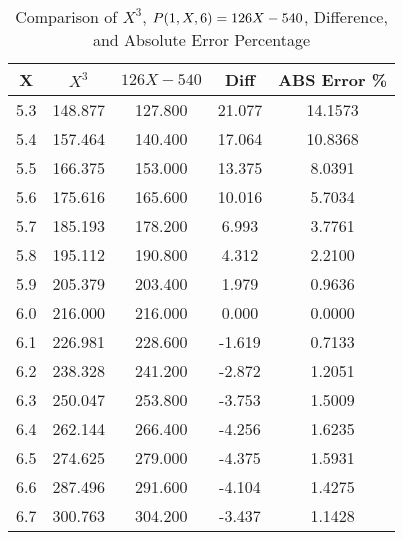 ﻿%
\begin{table}[h!]
    \centering
    \caption{Comparison of $X^3$, ${P}(1,X,6) = 126X-540$, Difference, and Absolute Error Percentage}
    \begin{tabular}{|c|c|c|c|c|}
        \hline
        \textbf{X} & \textbf{$X^3$} & \textbf{$126X-540$} & \textbf{Diff} & \textbf{ABS Error \%} \\ \hline
        5.3        & 148.877        & 127.800             & 21.077        & 14.1573               \\ \hline
        5.4        & 157.464        & 140.400             & 17.064        & 10.8368               \\ \hline
        5.5        & 166.375        & 153.000             & 13.375        & 8.0391                \\ \hline
        5.6        & 175.616        & 165.600             & 10.016        & 5.7034                \\ \hline
        5.7        & 185.193        & 178.200             & 6.993         & 3.7761                \\ \hline
        5.8        & 195.112        & 190.800             & 4.312         & 2.2100                \\ \hline
        5.9        & 205.379        & 203.400             & 1.979         & 0.9636                \\ \hline
        6.0        & 216.000        & 216.000             & 0.000         & 0.0000                \\ \hline
        6.1        & 226.981        & 228.600             & -1.619        & 0.7133                \\ \hline
        6.2        & 238.328        & 241.200             & -2.872        & 1.2051                \\ \hline
        6.3        & 250.047        & 253.800             & -3.753        & 1.5009                \\ \hline
        6.4        & 262.144        & 266.400             & -4.256        & 1.6235                \\ \hline
        6.5        & 274.625        & 279.000             & -4.375        & 1.5931                \\ \hline
        6.6        & 287.496        & 291.600             & -4.104        & 1.4275                \\ \hline
        6.7        & 300.763        & 304.200             & -3.437        & 1.1428                \\ \hline

\end{tabular}
\end{table}
